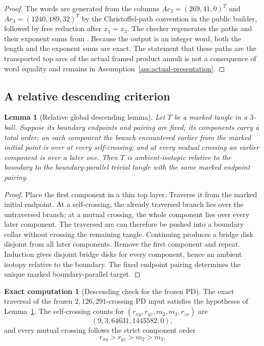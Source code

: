 \documentclass[10pt,reqno]{amsart}
\newtheorem{lemma}[theorem]{Lemma}
\theoremstyle{definition}
\newtheorem{computation}[theorem]{Exact computation}
\theoremstyle{remark}
\begin{document}
\begin{proof}
The words are generated from the columns $Ae_2=(269,41,0)^T$ and
$Ae_3=(1240,189,32)^T$ by the Christoffel-path convention in the public
builder, followed by free reduction after $x_1=x_3$.  The checker
 regenerates the paths and
their exponent sums from .
Because the output is an integer word, both the length and the exponent sums
are exact.  The statement that these paths are the transported top arcs of
the actual framed product annuli is not a consequence of word equality and
remains in Assumption~\ref{ass:actual-presentation}.
\end{proof}

\subsection{A relative descending criterion}

\begin{lemma}[Relative global descending lemma]\label{lem:global-descending}
Let $T$ be a marked tangle in a $3$-ball.  Suppose its boundary endpoints and
pairing are fixed; its components carry a total order; on each component the
branch encountered earlier from the marked initial point is over at every
self-crossing; and at every mutual crossing an earlier component is over a
later one.  Then $T$ is ambient-isotopic relative to the boundary to the
boundary-parallel trivial tangle with the same marked endpoint pairing.
\end{lemma}

\begin{proof}
Place the first component in a thin top layer.  Traverse it from the marked
initial endpoint.  At a self-crossing, the already traversed branch lies over
the untraversed branch; at a mutual crossing, the whole component lies over
every later component.  The traversed arc can therefore be pushed into a
boundary collar without crossing the remaining tangle.  Continuing produces
a bridge disk disjoint from all later components.  Remove the first component
and repeat.  Induction gives disjoint bridge disks for every component, hence
an ambient isotopy relative to the boundary.  The fixed endpoint pairing
determines the unique marked boundary-parallel target.
\end{proof}

\begin{computation}[Descending check for the frozen PD]\label{comp:descending}
The exact traversal of the frozen $2{,}126{,}291$-crossing PD input satisfies
the hypotheses of Lemma~\ref{lem:global-descending}.  The self-crossing counts
for $(r_{xy},r_{yz},m_2,m_3,r_{zx})$ are
\begin{equation}\label{eq:self-cross-counts}
(9,3,64631,1445582,0),
\end{equation}
and every mutual crossing follows the strict component order
\begin{equation}\label{eq:height-order}
r_{xy}>r_{yz}>m_2>m_3.
\end{equation}
\end{computation}
\end{document}

